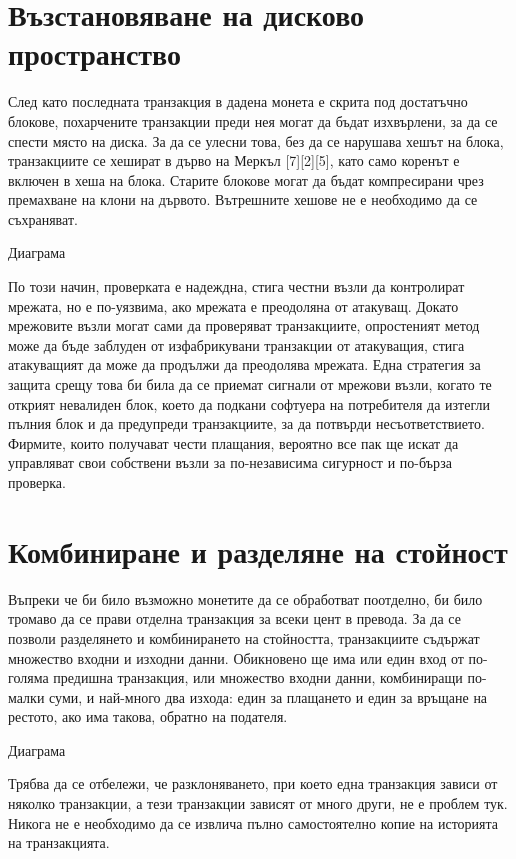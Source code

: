 \documentclass[11pt,a4paper]{article}
\begin{document}
\section{Възстановяване на дисково пространство}
След като последната транзакция в дадена монета е скрита под достатъчно блокове, похарчените транзакции преди нея могат да бъдат изхвърлени, за да се спести място на диска. За да се улесни това, без да се нарушава хешът на блока, транзакциите се хешират в дърво на Меркъл [7][2][5], като само коренът е включен в хеша на блока. Старите блокове могат да бъдат компресирани чрез премахване на клони на дървото. Вътрешните хешове не е необходимо да се съхраняват.

Диаграма

По този начин, проверката е надеждна, стига честни възли да контролират мрежата, но е по-уязвима, ако мрежата е преодоляна от атакуващ. Докато мрежовите възли могат сами да проверяват транзакциите, опростеният метод може да бъде заблуден от изфабрикувани транзакции от атакуващия, стига атакуващият да може да продължи да преодолява мрежата. Една стратегия за защита срещу това би била да се приемат сигнали от мрежови възли, когато те открият невалиден блок, което да подкани софтуера на потребителя да изтегли пълния блок и да предупреди транзакциите, за да потвърди несъответствието. Фирмите, които получават чести плащания, вероятно все пак ще искат да управляват свои собствени възли за по-независима сигурност и по-бърза проверка.

\section{Комбиниране и разделяне на стойност}
Въпреки че би било възможно монетите да се обработват поотделно, би било тромаво да се прави отделна транзакция за всеки цент в превода. За да се позволи разделянето и комбинирането на стойността, транзакциите съдържат множество входни и изходни данни. Обикновено ще има или един вход от по-голяма предишна транзакция, или множество входни данни, комбиниращи по-малки суми, и най-много два изхода: един за плащането и един за връщане на рестото, ако има такова, обратно на подателя.

Диаграма

Трябва да се отбележи, че разклоняването, при което една транзакция зависи от няколко транзакции, а тези транзакции зависят от много други, не е проблем тук. Никога не е необходимо да се извлича пълно самостоятелно копие на историята на транзакцията.
\end{document}
